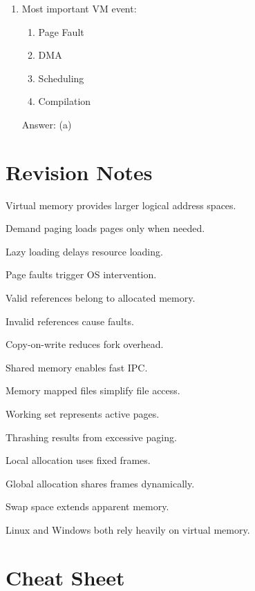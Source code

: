 \begin{enumerate}
\item Most important VM event:
\begin{enumerate}[label=(\alph*)]
\item Page Fault
\item DMA
\item Scheduling
\item Compilation
\end{enumerate}
Answer: (a)
\end{enumerate}

\section{Revision Notes}

\begin{revisionnotes}
\item Virtual memory provides larger logical address spaces.
\item Demand paging loads pages only when needed.
\item Lazy loading delays resource loading.
\item Page faults trigger OS intervention.
\item Valid references belong to allocated memory.
\item Invalid references cause faults.
\item Copy-on-write reduces fork overhead.
\item Shared memory enables fast IPC.
\item Memory mapped files simplify file access.
\item Working set represents active pages.
\item Thrashing results from excessive paging.
\item Local allocation uses fixed frames.
\item Global allocation shares frames dynamically.
\item Swap space extends apparent memory.
\item Linux and Windows both rely heavily on virtual memory.
\end{revisionnotes}

\section{Cheat Sheet}

